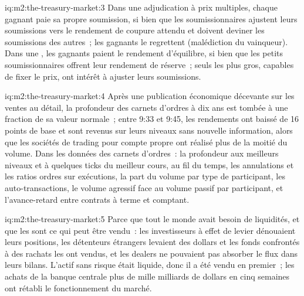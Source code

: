\begin{solution}{iq:m2:the-treasury-market:3}
Dans une adjudication à prix multiples, chaque gagnant paie sa propre soumission, si bien que les soumissionnaires
ajustent leurs soumissions vers le rendement de coupure attendu et doivent deviner les soumissions des autres~; les gagnants le regrettent
(malédiction du vainqueur). Dans une , les gagnants paient le rendement d'équilibre,
si bien que les petits soumissionnaires offrent leur rendement de réserve~; seuls les plus gros, capables de fixer le prix,
ont intérêt à ajuster leurs soumissions.
\end{solution}

\begin{solution}{iq:m2:the-treasury-market:4}
Après une publication économique décevante sur les ventes au détail, la profondeur des carnets d'ordres à dix ans est tombée à une
fraction de sa valeur normale~; entre 9:33 et 9:45, les rendements ont baissé de 16 points de base et
sont revenus sur leurs niveaux sans nouvelle information, alors que les sociétés de trading pour compte propre ont réalisé plus de la moitié
du volume. Dans les données des carnets d'ordres~: la profondeur aux meilleurs niveaux et à quelques ticks du meilleur cours,
au fil du temps, les annulations et les ratios ordres sur exécutions, la part du volume
par type de participant, les auto-transactions, le volume agressif face au volume passif par
participant, et l'avance-retard entre contrats à terme et comptant.
\end{solution}

\begin{solution}{iq:m2:the-treasury-market:5}
Parce que tout le monde avait besoin de liquidités, et que les  sont ce qui peut être vendu~: les investisseurs à effet de levier dénouaient leurs positions,
les détenteurs étrangers levaient des dollars et les fonds confrontés à des rachats les ont vendus,
et les dealers ne pouvaient pas absorber le flux dans leurs bilans.
L'actif sans risque était liquide, donc il a été vendu en premier~; les achats de la banque centrale
plus de mille milliards de dollars en cinq semaines ont rétabli le fonctionnement du marché.
\end{solution}

